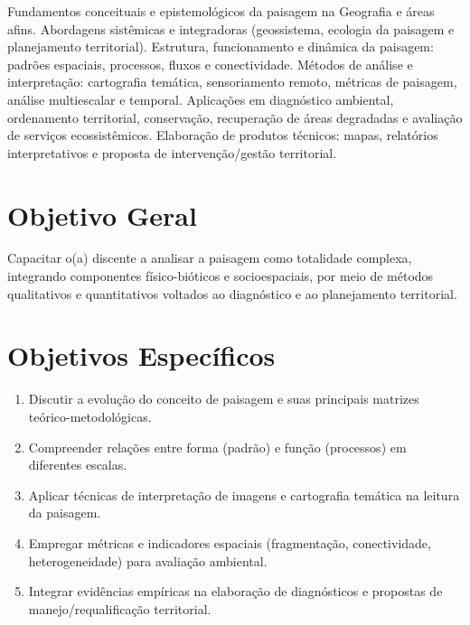 \documentclass[11pt,a4paper]{article}
\begin{document}
\vspace{0.3cm}

\begin{tcolorbox}[ementabox]
Fundamentos conceituais e epistemológicos da paisagem na Geografia e áreas afins. Abordagens sistêmicas e integradoras (geossistema, ecologia da paisagem e planejamento territorial). Estrutura, funcionamento e dinâmica da paisagem: padrões espaciais, processos, fluxos e conectividade. Métodos de análise e interpretação: cartografia temática, sensoriamento remoto, métricas de paisagem, análise multiescalar e temporal. Aplicações em diagnóstico ambiental, ordenamento territorial, conservação, recuperação de áreas degradadas e avaliação de serviços ecossistêmicos. Elaboração de produtos técnicos: mapas, relatórios interpretativos e proposta de intervenção/gestão territorial.
\end{tcolorbox}

\section*{Objetivo Geral}

Capacitar o(a) discente a analisar a paisagem como totalidade complexa, integrando componentes físico-bióticos e socioespaciais, por meio de métodos qualitativos e quantitativos voltados ao diagnóstico e ao planejamento territorial.

\section*{Objetivos Específicos}

\begin{enumerate}
\item Discutir a evolução do conceito de paisagem e suas principais matrizes teórico-metodológicas.
\item Compreender relações entre forma (padrão) e função (processos) em diferentes escalas.
\item Aplicar técnicas de interpretação de imagens e cartografia temática na leitura da paisagem.
\item Empregar métricas e indicadores espaciais (fragmentação, conectividade, heterogeneidade) para avaliação ambiental.
\item Integrar evidências empíricas na elaboração de diagnósticos e propostas de manejo/requalificação territorial.
\end{enumerate}
\end{document}
